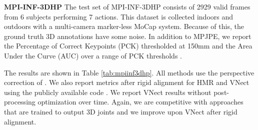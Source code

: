 \documentclass[10pt,twocolumn,letterpaper]{article}
\begin{document}
\begin{table}[]
\centering
{}
\caption{{\small {\bf Human3.6M, Protocol 1.}  MPJPE and reconstruction loss in mm.
 * indicates methods that output more than 3D joints.}}
\label{tab:P1}
\vspace{-1em}
\end{table}


\vspace{3mm}
\noindent\textbf{MPI-INF-3DHP}
The test set of MPI-INF-3DHP consists of 2929 valid frames from 6 subjects
performing 7 actions. This dataset is collected  indoors
and outdoors with a multi-camera marker-less MoCap system. Because of
this, the ground truth 3D annotations have some noise.
In addition to MPJPE, we report the Percentage of Correct Keypoints
(PCK) thresholded at 150mm and the Area Under the
Curve (AUC) over a range of PCK thresholds
\cite{Mehta17}. 

The results are shown in Table \ref{tab:mpiinf3dhp}. All methods use
the perspective correction of \cite{Mehta17}. 
We also report metrics after rigid alignment for HMR and VNect using the
publicly available code \cite{VNect}. We report VNect results without
post-processing optimization over time. Again, we are competitive with approaches that are trained to output 3D joints and
we improve upon VNect after rigid alignment. 
\end{document}
